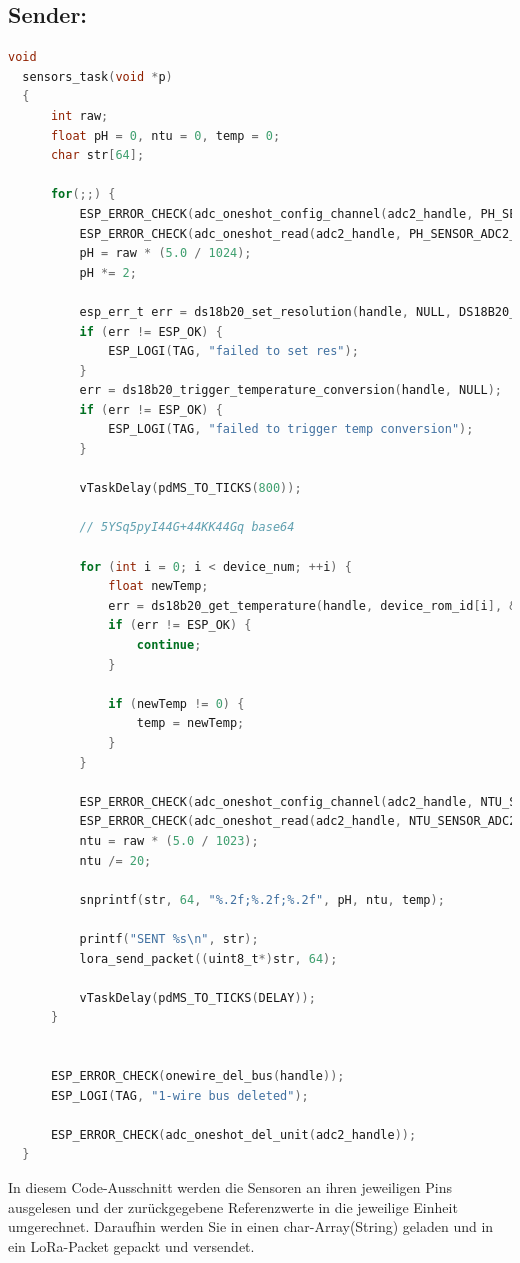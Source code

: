 \subsection*{Sender:}
\begin{lstlisting}[language=C, caption={Sender lest die Daten der Sensoren aus und überträgt sie via LoRa}, label={lst:Sender}]
  void
  sensors_task(void *p)
  {
      int raw;
      float pH = 0, ntu = 0, temp = 0;
      char str[64];
  
      for(;;) {
          ESP_ERROR_CHECK(adc_oneshot_config_channel(adc2_handle, PH_SENSOR_ADC2_CHANNEL, &chan_cfg));
          ESP_ERROR_CHECK(adc_oneshot_read(adc2_handle, PH_SENSOR_ADC2_CHANNEL, &raw));
          pH = raw * (5.0 / 1024);
          pH *= 2;
  
          esp_err_t err = ds18b20_set_resolution(handle, NULL, DS18B20_RESOLUTION_12B);
          if (err != ESP_OK) {
              ESP_LOGI(TAG, "failed to set res");
          }
          err = ds18b20_trigger_temperature_conversion(handle, NULL); 
          if (err != ESP_OK) {
              ESP_LOGI(TAG, "failed to trigger temp conversion");
          }
          
          vTaskDelay(pdMS_TO_TICKS(800));
  
          // 5YSq5pyI44G+44KK44Gq base64
  
          for (int i = 0; i < device_num; ++i) {
              float newTemp;
              err = ds18b20_get_temperature(handle, device_rom_id[i], &newTemp);
              if (err != ESP_OK) {
                  continue;
              }
  
              if (newTemp != 0) {
                  temp = newTemp;
              }
          }
  
          ESP_ERROR_CHECK(adc_oneshot_config_channel(adc2_handle, NTU_SENSOR_ADC2_CHANNEL, &chan_cfg));
          ESP_ERROR_CHECK(adc_oneshot_read(adc2_handle, NTU_SENSOR_ADC2_CHANNEL, &raw));
          ntu = raw * (5.0 / 1023);
          ntu /= 20;
  
          snprintf(str, 64, "%.2f;%.2f;%.2f", pH, ntu, temp);
  
          printf("SENT %s\n", str);
          lora_send_packet((uint8_t*)str, 64);
  
          vTaskDelay(pdMS_TO_TICKS(DELAY));
      }
  
  
      ESP_ERROR_CHECK(onewire_del_bus(handle));
      ESP_LOGI(TAG, "1-wire bus deleted");
  
      ESP_ERROR_CHECK(adc_oneshot_del_unit(adc2_handle));
  } 
\end{lstlisting}
In diesem Code-Ausschnitt werden die Sensoren an ihren jeweiligen Pins ausgelesen und der zurückgegebene Referenzwerte in die jeweilige Einheit umgerechnet. 
Daraufhin werden Sie in einen char-Array(String) geladen und in ein LoRa-Packet gepackt und versendet.

